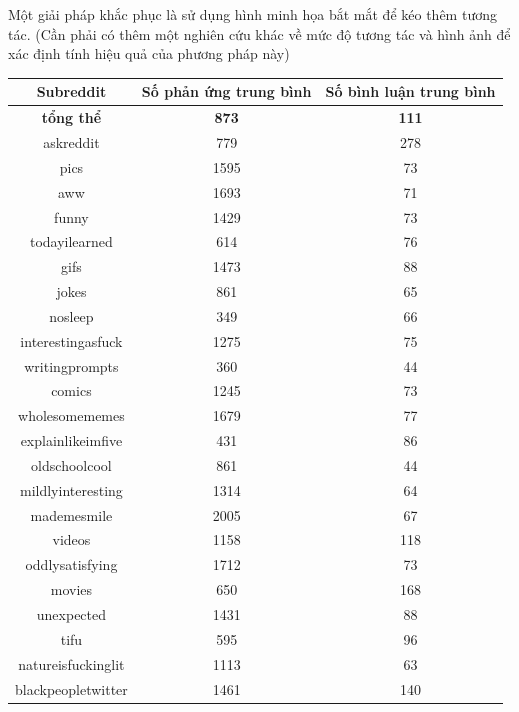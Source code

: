 \documentclass[10pt,a4paper]{article}
\begin{document}
Một giải pháp khắc phục là sử dụng hình minh họa bắt mắt để kéo thêm tương tác. (Cần phải có thêm một nghiên cứu khác về mức độ tương tác và hình ảnh để xác định tính hiệu quả của phương pháp này)

\begin{table}[hp]
    \centering
    \begin{tabular}{|c|c|c|}
        \hline
        Subreddit & Số phản ứng trung bình & Số bình luận trung bình \\
        \hline
        \textbf{tổng thể} & \textbf{873} & \textbf{111} \\
        \hline
        askreddit & 779 & 278 \\
        \hline
        pics & 1595 & 73 \\
        \hline
        aww & 1693 & 71 \\
        \hline
        funny & 1429 & 73 \\
        \hline
        todayilearned & 614 & 76 \\
        \hline
        gifs & 1473 & 88 \\
        \hline
        jokes & 861 & 65 \\
        \hline
        nosleep & 349 & 66 \\
        \hline
        interestingasfuck & 1275 & 75 \\
        \hline
        writingprompts & 360 & 44 \\
        \hline
        comics & 1245 & 73 \\
        \hline
        wholesomememes & 1679 & 77 \\
        \hline
        explainlikeimfive & 431 & 86 \\
        \hline
        oldschoolcool & 861 & 44 \\
        \hline
        mildlyinteresting & 1314 & 64 \\
        \hline
        mademesmile & 2005 & 67 \\
        \hline
        videos & 1158 & 118 \\
        \hline
        oddlysatisfying & 1712 & 73 \\
        \hline
        movies & 650 & 168 \\
        \hline
        unexpected & 1431 & 88 \\
        \hline
        tifu & 595 & 96 \\
        \hline
        natureisfuckinglit & 1113 & 63 \\
        \hline
        blackpeopletwitter & 1461 & 140 \\

\end{tabular}
\end{table}
\end{document}
